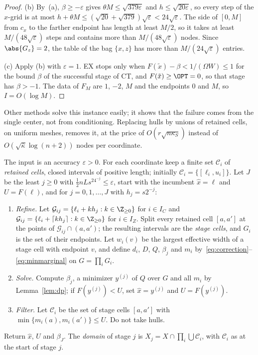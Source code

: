 \begin{proof}
(b) By~(a), $\beta\ge-\varepsilon$ gives $\theta M\le\sqrt{379\varepsilon}$
and $h\le\sqrt{20\varepsilon}$, so every step of the $x$-grid is at most
$h+\theta M\le(\sqrt{20}+\sqrt{379})\sqrt\varepsilon<24\sqrt\varepsilon$. The
side of $[0,M]$ from $c_x$ to the farther endpoint has length at least $M/2$,
so it takes at least $M/(48\sqrt\varepsilon)$ steps and contains more than
$M/(48\sqrt\varepsilon)$ nodes. Since $\abs{G_z}=2$, the table of the bag
$\{x,z\}$ has more than $M/(24\sqrt\varepsilon)$ entries.

(c) Apply (b) with $\varepsilon=1$. EX stops only when
$F(\tilde x)-\beta<1/(\Omega W)\le1$ for the bound $\beta$ of the successful
stage of CT, and $F(\tilde x)\ge\OPT=0$, so that stage has $\beta>-1$. The
data of $F_M$ are $1$, $-2$, $M$ and the endpoints $0$ and $M$, so
$I=O(\log M)$.
\end{proof}

Other methods solve this instance easily; it shows that the failure comes
from the single center, not from conditioning. Replacing hulls by unions of
retained cells, on uniform meshes, removes it, at the price of
$O(r\sqrt{n\kappa_S})$ instead of $O(\sqrt{\bar\kappa}\log(n+2))$ nodes per
coordinate.

\begin{algorithm}\label{alg:uc}
The input is an accuracy $\varepsilon>0$. For each coordinate keep a finite
set $\mathcal C_i$ of \emph{retained cells}, closed intervals of positive
length; initially $\mathcal C_i=\{[\ell_i,u_i]\}$. Let $J$ be the least
$j\ge0$ with $\frac12nLs^24^{-j}\le\varepsilon$, start with the incumbent
$\hat x=\ell$ and $U=F(\ell)$, and for $j=0,1,\dots,J$ with $h_j=s2^{-j}$:
\begin{enumerate}[label=(\roman*)]
\item \emph{Refine.} Let $\mathcal G_{ij}=\{\ell_i+kh_j:k\in\Z_{\ge0}\}$ for
$i\in I_C$ and $\mathcal G_{ij}=\{\ell_i+\lceil kh_j\rceil:k\in\Z_{\ge0}\}$ for
$i\in I_Z$. Split every retained cell $[a,a']$ at the points of
$\mathcal G_{ij}\cap(a,a')$; the resulting intervals are the \emph{stage
cells}, and $G_i$ is the set of their endpoints. Let $w_i(v)$ be the largest
effective width of a stage cell with endpoint $v$, and define $d_i$, $D$,
$Q$, $\beta_j$ and $m_i$ by~\eqref{eq:correction}--\eqref{eq:minmarginal} on
$G=\prod_iG_i$.
\item \emph{Solve.} Compute $\beta_j$, a minimizer $y^{(j)}$ of $Q$ over $G$
and all $m_i$ by Lemma~\ref{lem:dp}; if $F(y^{(j)})<U$, set $\hat x=y^{(j)}$
and $U=F(y^{(j)})$.
\item \emph{Filter.} Let $\mathcal C_i$ be the set of stage cells $[a,a']$
with $\min\{m_i(a),m_i(a')\}\le U$. Do not take hulls.
\end{enumerate}
Return $\hat x$, $U$ and $\beta_J$. The \emph{domain} of stage $j$ is
$X_j=X\cap\prod_i\bigcup\mathcal C_i$, with $\mathcal C_i$ as at the start of
stage $j$.
\end{algorithm}

